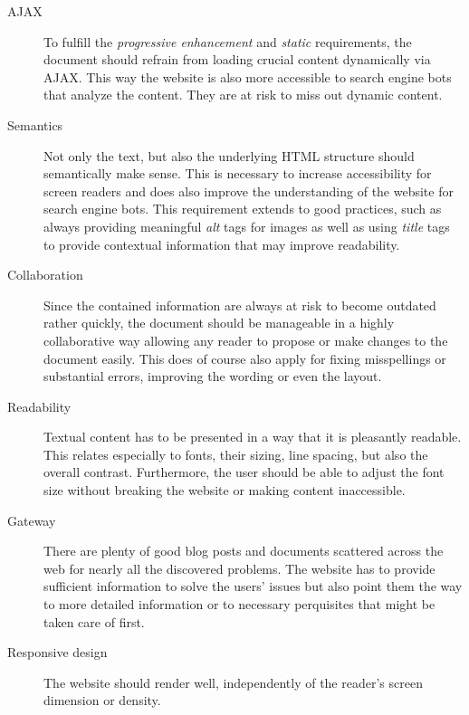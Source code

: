 \begin{description}
	\item[\ac{AJAX}]\hfill

	To fulfill the \textit{progressive enhancement} and \textit{static} requirements, the document should refrain from loading crucial content dynamically via \ac{AJAX}. This way the website is also more accessible to search engine bots that analyze the content. They are at risk to miss out dynamic content.

	\item[Semantics]\hfill

	Not only the text, but also the underlying \ac{HTML} structure should semantically make sense. This is necessary to increase accessibility for screen readers and does also improve the understanding of the website for search engine bots. This requirement extends to good practices, such as always providing meaningful \textit{alt} tags for images as well as using \textit{title} tags to provide contextual information that may improve readability.

	\item[Collaboration]\hfill

	Since the contained information are always at risk to become outdated rather quickly, the document should be manageable in a highly collaborative way allowing any reader to propose or make changes to the document easily. This does of course also apply for fixing misspellings or substantial errors, improving the wording or even the layout.

	\item[Readability]\hfill

	Textual content has to be presented in a way that it is pleasantly readable. This relates especially to fonts, their sizing, line spacing, but also the overall contrast. Furthermore, the user should be able to adjust the font size without breaking the website or making content inaccessible.

	\item[Gateway]\hfill

	There are plenty of good blog posts and documents scattered across the web for nearly all the discovered problems. The website has to provide sufficient information to solve the users' issues but also point them the way to more detailed information or to necessary perquisites that might be taken care of first.

	\item[Responsive design]\hfill

	The website should render well, independently of the reader's screen dimension or density.


\end{description}
